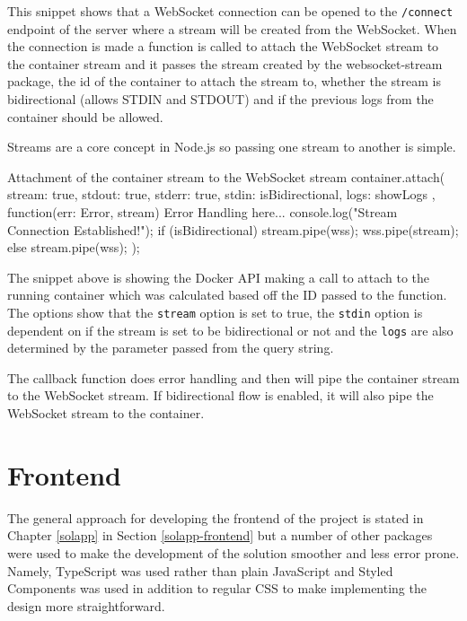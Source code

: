 This snippet shows that a WebSocket connection can be opened to the \texttt{/connect} endpoint of the server where a stream will be created from the WebSocket. When the connection is made a function is called to attach the WebSocket stream to the container stream and it passes the stream created by the websocket-stream package, the id of the container to attach the stream to, whether the stream is bidirectional (allows STDIN and STDOUT) and if the previous logs from the container should be allowed.

Streams are a core concept in Node.js so passing one stream to another is simple.

\begin{sexylisting}{Attachment of the container stream to the WebSocket stream}
container.attach(
    {
        stream: true,
        stdout: true,
        stderr: true,
        stdin: isBidirectional,
        logs: showLogs
    },
    function(err: Error, stream) {
        {Error Handling here...}
        console.log("Stream Connection Established!");
        if (isBidirectional) {
            stream.pipe(wss);
            wss.pipe(stream);
        } else {
            stream.pipe(wss);
        }
    }
);
\end{sexylisting}

The snippet above is showing the Docker API making a call to attach to the running container which was calculated based off the ID passed to the function. The options show that the \texttt{stream} option is set to true, the \texttt{stdin} option is dependent on if the stream is set to be bidirectional or not and the \texttt{logs} are also determined by the parameter passed from the query string.

The callback function does error handling and then will pipe the container stream to the WebSocket stream. If bidirectional flow is enabled, it will also pipe the WebSocket stream to the container. 




\section{Frontend}

The general approach for developing the frontend of the project is stated in Chapter \ref{solapp} in Section \ref{solapp-frontend} but a number of other packages were used to make the development of the solution smoother and less error prone. Namely, TypeScript \cite{typescript} was used rather than plain JavaScript and Styled Components \cite{styledcomp} was used in addition to regular CSS to make implementing the design more straightforward.

